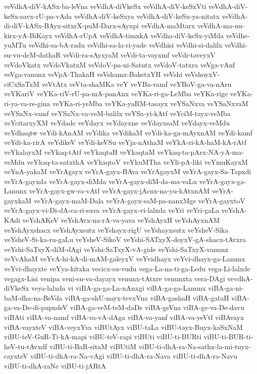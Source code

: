 {veVdhA-diV-kASx-ba-leVna
veVdhA-diVkeSx
veVdhA-diV-keSxVti
veVdhA-diV-keSx-savx-rU-pa-vAda
veVdhA-diV-keSxya
veVdhA-diV-keSx-ya-nitatx
veVdhA-di-diV-kASx-BAyx-sitxrX-puM-Darx-sAyxpi
veVdhA-maMtarx
veVdhA-ma-nu-kirx-yA-BiKayx
veVdhA-rUpA
veVdhA-timxkA
veVdha-diV-keSx-yiMda
veVdhe-yuMTu
veVdhi-sa-bA-radu
veVdhi-sa-la-ri-yade
veVdhisi
veVdhi-si-dalilx
veVdhi-su-vu-deM-dathaR
veVdi-ra-sAyxyaM
veVdi-ta-vayxmf
veVdi-taveyxV
veVdoVkatx
veVdoVkatxM
veVdoV-pa-ni-Satutx
veVdoV-tatxra
veVga-vAnf
veVga-vanunx
veVpA-ThakaH
veVshamx-BaketxYH
veVshi
veVshoyxV-ciCxSaTxM
veVtAtx
veVta-shaMKa
veY
veYBa-vamf
veYBoV-ga-va-nAru
veYKariV
veYKa-riV-rU-pa-mA-panAnx
veYKa-ri-ga-LeMba
veYKa-rige
veYKa-ri-ya-va-re-gina
veYKa-ri-yeMba
veYKa-yaRM-tasayx
veYSaNxva
veYSaNxvaM
veYSaNx-vamf
veYSaNx-va-veM-balilx
veYSa-yi-kAtf
veYciM-tayx-veMba
veYcitarxyXM
veYdade
veYdayx
veYdayxne
veYdayxsaM
veYdayx-veMdu
veYdhaqtw
veYdi-kAnAM
veYdika
veYdikaM
veYdi-ka-ga-mAyxnAM
veYdi-kamf
veYdi-ka-rirA
veYdikeV
veYdi-keVSu
veYja-nAthaM
veYkA-ri-kA-haM-kA-rAtf
veYkalayxM
veYkaq-tAtf
veYkaqtaH
veYkaqtaM
veYkaq-ta-pArx-NA-yA-ma-veMdu
veYkaq-ta-satxthA
veYkaqtoV
veYkuMTha
veYli-pA-liki
veYmuKayxM
veYnA-yakaM
veYrAgayx
veYrA-gayx-BAva
veYrAgayxM
veYrA-gayx-Sa-Tapxdi
veYrA-gayxda
veYrA-gayx-diMda
veYrA-gayx-diM-da-ma-vaLu
veYrA-gayx-ga-Lanunx
veYrA-gayx-gw-ra-vAtf
veYrA-gayx-jAcnx-na-yu-kAtxnAM
veYrA-gayxkaM
veYrA-gayx-maM-Dala
veYrA-gayx-saM-pa-nanxMge
veYrA-gayxtoV
veYrA-gayx-vi-Di-dA-ca-ri-suva
veYrA-gayx-vi-lalxda
veYri
veYri-gaLa
veYshA-KAdi
veYshAKeV
veYshAvx-na-rA-va-yava
veYshAyxH
veYshAyxnAM
veYshAyxshacx
veYshAyxsutx
veYshayx-rigU
veYshayxsutx
veYsheV-Sika
veYsheV-Si-ka-ru-gaLu
veYsheV-SikoV
veYshi-SATxyX-doyxV-gA-shacx-tAvxra
veYshi-SaTxyX-diM-dAgi
veYshi-SaTxyX-vA-gide
veYshi-SaTxyX-vanunx
veYvAhaM
veYvA-hi-kA-di-mAM-galeyxV
veYvidhayx
veYvi-dhayx-ga-Lanunx
veYvi-dhayxte
veYya-kitxka
vecicx-su-vudu
vega-La-na-ti-ga-Ledu
vega-Li-lalxde
vegagx-Lisi
venipa
veni-su-va-dayayx
venunx-tAtxre
venunxta
vera-DAgi
vevdhA-diVkeSx
veya-lalxda
vi
viBA-ga-ga-La-nAnxgi
viBA-ga-ga-Lanunx
viBA-ga-ni-baM-dha-na-BeVda
viBA-ga-shU-nayx-tevxVna
viBA-gashaH
viBA-gataH
viBA-ga-va-De-di-pupxdeV
viBA-ga-veM-teM-daDe
viBA-geVna
viBA-ge-va-De-davu
viBAti
viBA-va-namf
viBA-va-vA-dAga
viBA-va-yanf
viBA-va-yeVtf
viBAvayx
viBA-vayxteV
viBA-veyxYva
viBUtAyx
viBU-taLa
viBU-tayx-Buyx-kaSxNaM
viBU-teV-GuR-Ti-kA-mapi
viBU-teV-rapi
viBUti
viBU-ti-BURti
viBU-ti-BUR-ti-heV-tu-tAvxdf
viBU-ti-BaR-sitaM
viBUtiM
viBU-ti-dhA-ra-Na-sathx-la-mi-tuyx-cayxteV
viBU-ti-dhA-ra-Na-vAgi
viBU-ti-dhA-ra-Nava
viBU-ti-dhA-ra-Navu
viBU-ti-dhA-raNe
viBU-ti-jARtA
}
